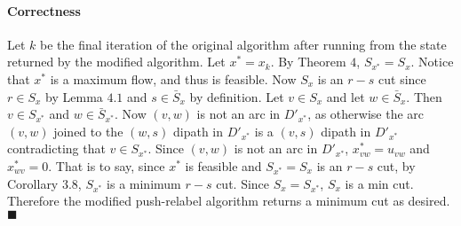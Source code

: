 \documentclass[letterpaper,12pt,oneside,onecolumn]{article}
\begin{document}
\paragraph{Correctness}
Let $k$ be the final iteration of the original algorithm after running from the state returned by the modified algorithm. Let $x^* = x_k$. By Theorem $4$, $S_{x^*} = S_x$. Notice that $x^*$ is a maximum flow, and thus is feasible. Now $S_x$ is an $r-s$ cut since $r \in S_x$ by Lemma $4.1$ and $s \in \bar{S}_x$ by definition. Let $v \in S_x$ and let $w \in \bar{S}_x$. Then $v \in S_{x^*}$ and $w \in \bar{S}_{x^*}$. Now $(v,w)$ is not an arc in $D'_{x^*}$, as otherwise the arc $(v,w)$ joined to the $(w,s)$ dipath in $D'_{x^*}$ is a $(v,s)$ dipath in $D'_{x^*}$ contradicting that $v \in S_{x^*}$. Since $(v,w)$ is not an arc in $D'_{x^*}$, $x^*_{vw} = u_{vw}$ and $x^*_{wv} = 0$. That is to say, since $x^*$ is feasible and $S_{x^*} = S_x$ is an $r-s$ cut, by Corollary $3.8$, $S_{x^*}$ is a minimum $r-s$ cut. Since $S_x = S_{x^*}$, $S_x$ is a min cut. Therefore the modified push-relabel algorithm returns a minimum cut as desired. $\blacksquare$
\end{document}
